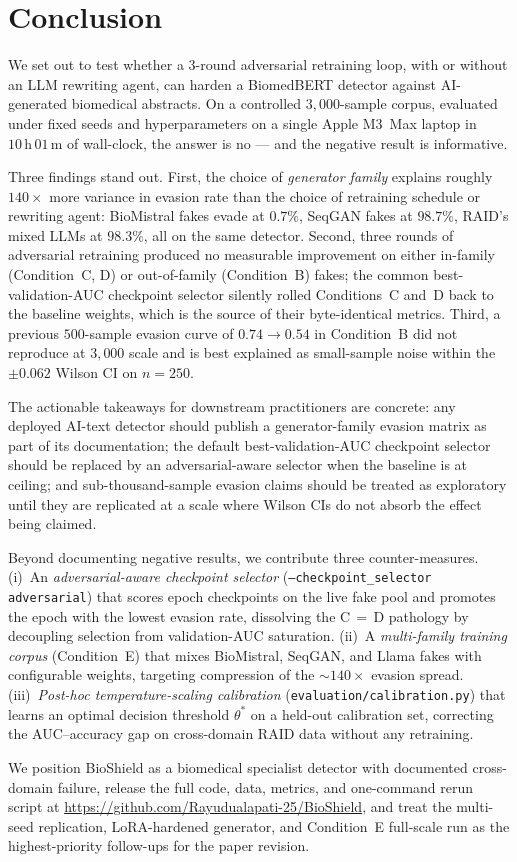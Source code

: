 \section{Conclusion}
\label{sec:conclusion}

We set out to test whether a 3-round adversarial retraining loop, with
or without an LLM rewriting agent, can harden a BiomedBERT detector
against AI-generated biomedical abstracts. On a controlled
\(3{,}000\)-sample corpus, evaluated under fixed seeds and
hyperparameters on a single Apple M3~Max laptop in
\(10\,\mathrm{h}\,01\,\mathrm{m}\) of wall-clock, the answer is no — and
the negative result is informative.

Three findings stand out. First, the choice of \emph{generator family}
explains roughly \(140\times\) more variance in evasion rate than the
choice of retraining schedule or rewriting agent: BioMistral fakes evade
at \(0.7\%\), SeqGAN fakes at \(98.7\%\), RAID's mixed LLMs at
\(98.3\%\), all on the same detector. Second, three rounds of
adversarial retraining produced no measurable improvement on either
in-family (Condition~C, D) or out-of-family (Condition~B) fakes; the
common best-validation-AUC checkpoint selector silently rolled
Conditions~C and~D back to the baseline weights, which is the source of
their byte-identical metrics. Third, a previous \(500\)-sample evasion
curve of \(0.74 \to 0.54\) in Condition~B did not reproduce at
\(3{,}000\) scale and is best explained as small-sample noise within the
\(\pm 0.062\) Wilson CI on \(n = 250\).

The actionable takeaways for downstream practitioners are concrete: any
deployed AI-text detector should publish a
generator-family evasion matrix as part of its documentation; the
default best-validation-AUC checkpoint selector should be replaced by an
adversarial-aware selector when the baseline is at ceiling; and
sub-thousand-sample evasion claims should be treated as exploratory
until they are replicated at a scale where Wilson CIs do not absorb the
effect being claimed.

Beyond documenting negative results, we contribute three counter-measures.
(i)~An \emph{adversarial-aware checkpoint selector}
(\texttt{--checkpoint\_selector adversarial}) that scores epoch checkpoints
on the live fake pool and promotes the epoch with the lowest evasion rate,
dissolving the C\,$=$\,D pathology by decoupling selection from
validation-AUC saturation. (ii)~A \emph{multi-family training corpus}
(Condition~E) that mixes BioMistral, SeqGAN, and Llama fakes with
configurable weights, targeting compression of the \(\sim\!140\times\)
evasion spread. (iii)~\emph{Post-hoc temperature-scaling calibration}
(\texttt{evaluation/calibration.py}) that learns an optimal decision
threshold \(\theta^*\) on a held-out calibration set, correcting the
AUC--accuracy gap on cross-domain RAID data without any retraining.

We position BioShield as a biomedical specialist
detector with documented cross-domain failure, release the full code,
data, metrics, and one-command rerun script at
\url{https://github.com/Rayudualapati-25/BioShield}, and treat the
multi-seed replication, LoRA-hardened generator, and Condition~E
full-scale run as the highest-priority follow-ups for the paper revision.
